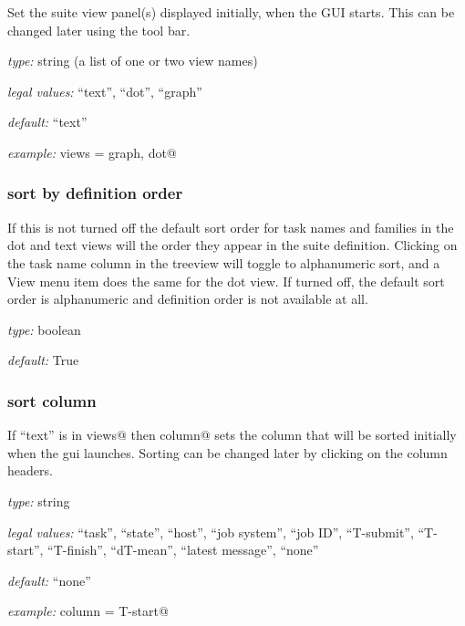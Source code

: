 Set the suite view panel(s) displayed initially, when the GUI starts.
This can be changed later using the tool bar.

\begin{myitemize}
\item {\em type:} string (a list of one or two view names)
\item {\em legal values:} ``text'', ``dot'',  ``graph''
\item {\em default:} ``text''
\item {\em example:} \lstinline@initial views = graph, dot@
\end{myitemize}

\subsubsection{sort by definition order}

If this is not turned off the default sort order for task names and
families in the dot and text views will the order they appear in the
suite definition. Clicking on the task name column in the treeview will
toggle to alphanumeric sort, and a View menu item does the same for the
dot view.  If turned off, the default sort order is alphanumeric and
definition order is not available at all.

\begin{myitemize}
\item {\em type:} boolean
\item {\em default:} True
\end{myitemize}


\subsubsection{sort column}

If ``text'' is in \lstinline@initial views@ then \lstinline@sort column@ sets
the column that will be sorted initially when the gui launches. Sorting can be
changed later by clicking on the column headers.

\begin{myitemize}
    \item {\em type:} string
    \item {\em legal values:} ``task'', ``state'', ``host'', ``job system'',
        ``job ID'', ``T-submit'', ``T-start'', ``T-finish'', ``dT-mean'',
        ``latest message'', ``none''
    \item {\em default:} ``none''
    \item {\em example:} \lstinline@sort column = T-start@
\end{myitemize}


